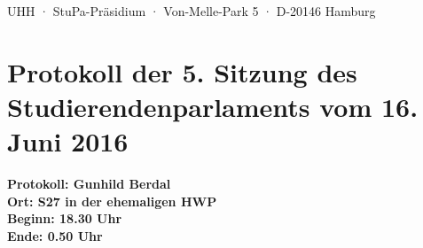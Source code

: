 \documentclass[ngerman,headheight=70pt]{scrartcl}
\begin{document}
    UHH · StuPa-Präsidium · Von-Melle-Park 5 · D-20146 Hamburg

    \section*{Protokoll der 5. Sitzung des Studierendenparlaments vom 16. Juni 2016}

    \textbf{Protokoll: Gunhild Berdal}\\
    \textbf{Ort: S27 in der ehemaligen HWP}\\
    \textbf{Beginn: 18.30 Uhr}\\
    \textbf{Ende: 0.50 Uhr}

    \vspace{0.5cm}
\end{document}
